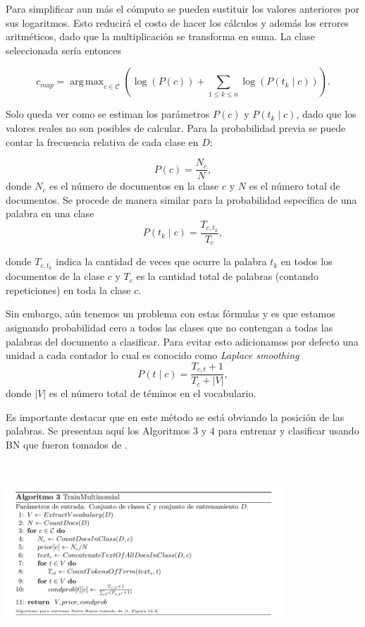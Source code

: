 \documentclass[t,compress,10pt,xcolor=dvipsnames]{beamer}
\DeclareMathOperator*{\argmax}{arg\,max}
\begin{document}
{		Para simplificar aun m\'as el c\'omputo se pueden sustituir los valores anteriores por sus logaritmos. Esto reducir\'a el costo de hacer los c\'alculos y adem\'as los errores aritm\'eticos, dado que la multiplicaci\'on se transforma en suma. La clase seleccionada ser\'ia entonces
		
		
		\[
		c_{map} = \argmax_{c\in\mathcal{C}} \left( \log(P(c))  + \sum_{1\leq k\leq n} \log(P(t_k\mid c)) \right).
		\]
		
		\framebreak
		
		
		Solo queda ver como se estiman los par\'ametros $P(c)$ y $P (t_k\mid c)$, dado que los valores reales no son posibles de calcular.	Para la probabilidad previa se puede contar la frecuencia relativa de cada clase en $D$:
		
		\[P(c) = \frac{ N_c }{N} , \]
		donde $N_c$ es el n\'umero de documentos en la clase $c$ y $N$ es el n\'umero total de documentos. Se procede de manera similar para la probabilidad espec\'ifica de una palabra en una clase
		\[
		P(t_k\mid c) =\frac{ T_{c,t_k}}{T_{c}},
		\]
		
		\framebreak
		
		
		donde $T_{c,t_k}$ indica la cantidad de veces que ocurre  la palabra $t_k$ en todos los documentos de la clase $c$ y $T_{c}$ es la cantidad total de palabras (contando repeticiones) en toda la clase $c$. 
		
		\framebreak
		
		Sin embargo, a\'un tenemos un problema con estas f\'ormulas y es que estamos asignando probabilidad cero a todos las clases que no contengan a todas las palabras del documento a clasificar. Para evitar esto adicionamos por defecto una unidad a cada contador lo cual es conocido como \emph{Laplace smoothing}
		\[
		P(t\mid c) = \frac{T_{c,t} + 1}{T_c + |V|},	
		\]
		donde $|V|$ es el n\'umero total de t\'eminos en el vocabulario.
		
		Es importante destacar que en este m\'etodo se est\'a obviando la posici\'on de las palabras. Se presentan aqu\'i los Algoritmos $3$ y $4$ para entrenar y clasificar usando BN que fueron tomados de \cite[Figure $13.2$]{B1}.
		
		
		\framebreak
		
		\textcolor{white}{.}
		
		\vspace{1.5em}
		\includegraphics[width=10.5cm]{TrainMultinomial.png}
		
}
\end{document}
